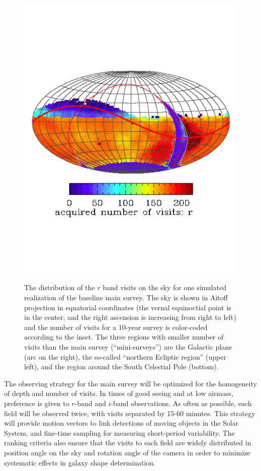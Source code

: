 \documentclass{emulateapj}
\begin{document}
\begin{figure}
\vskip -1.0in
\includegraphics[width=1.0\hsize,clip]{rBandWhite.pdf}
\vskip -1.0in
\caption{The distribution of the $r$ band visits on the sky for one simulated 
realization of the baseline main survey. The sky is shown in Aitoff projection 
in equatorial coordinates (the vernal equinoctial point is in the center, and 
the right ascension is increasing from right to left) and the number of visits for 
a 10-year survey is color-coded according to the inset. The three regions with 
smaller number of visits than the main survey (``mini-surveys'') are the Galactic 
plane (arc on the right), the so-called ``northern Ecliptic region'' (upper left), and
the region around the South Celestial Pole (bottom).} 
\label{Fig:rbandSky}
\end{figure}

The observing strategy for the main survey will be optimized for the homogeneity
of depth and number of visits. In times of good seeing and at low airmass, preference 
is given to $r$-band and $i$-band observations. As often as possible, each field will be 
observed twice, with visits separated by 15-60 minutes. This strategy will provide motion 
vectors to link detections of moving objects in the Solar System, and fine-time sampling 
for measuring short-period variability. The ranking criteria also ensure that the 
visits to each field are widely distributed in position angle on the sky and 
rotation angle of the camera in order to minimize systematic effects in galaxy shape 
determination.
\end{document}
